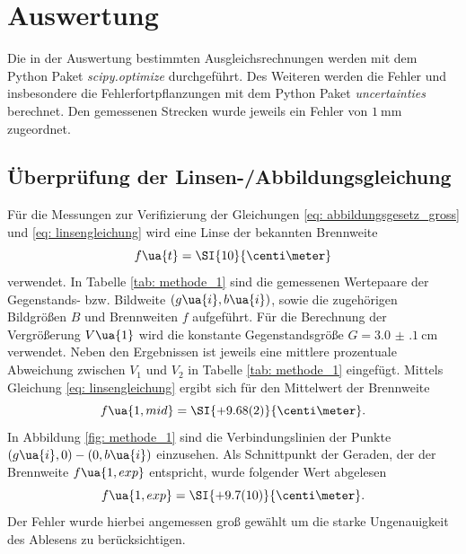 \section{Auswertung}
Die in der Auswertung bestimmten Ausgleichsrechnungen werden mit
dem Python Paket \emph{scipy.optimize}\cite{scipy} durchgeführt.
Des Weiteren werden die Fehler und insbesondere die Fehlerfortpflanzungen
mit dem Python Paket \emph{uncertainties}\cite{uncertainties} berechnet.
Den gemessenen Strecken wurde jeweils ein Fehler von $\SI{1}{\milli\meter}$ zugeordnet. %
\subsection{Überprüfung der Linsen-/Abbildungsgleichung}
Für die Messungen zur Verifizierung der Gleichungen \eqref{eq: abbildungsgesetz_gross} und \eqref{eq: linsengleichung} wird eine Linse
der bekannten Brennweite
\begin{equation}
  f\ua{t} = \SI{10}{\centi\meter}
\end{equation}
verwendet. In Tabelle \ref{tab: methode_1} sind die gemessenen Wertepaare der Gegenstands- bzw. Bildweite $(g\ua{i}, b\ua{i})$,
sowie die zugehörigen Bildgrößen $B$ und Brennweiten $f$ aufgeführt. Für die Berechnung der Vergrößerung $V\ua{1}$
wird die konstante Gegenstandsgröße $G = \SI{3.0(1)}{\centi\meter}$ verwendet. Neben den Ergebnissen ist jeweils
eine mittlere prozentuale Abweichung zwischen $V_1$ und $V_2$ in Tabelle \ref{tab: methode_1} eingefügt.
Mittels Gleichung \eqref{eq: linsengleichung} ergibt sich für den Mittelwert der Brennweite
\begin{equation}
  f\ua{1, mid} = \SI{+9.68(2)}{\centi\meter}.
\end{equation}
In Abbildung \ref{fig: methode_1} sind die Verbindungslinien der Punkte $(g\ua{i}, 0)-(0, b\ua{i})$ einzusehen. Als Schnittpunkt
der Geraden, der der Brennweite $f\ua{1, exp}$ entspricht, wurde folgender Wert abgelesen
\begin{equation}
  f\ua{1, exp} = \SI{+9.7(10)}{\centi\meter}.
\end{equation}
Der Fehler wurde hierbei angemessen groß gewählt um die starke Ungenauigkeit des Ablesens zu berücksichtigen.
